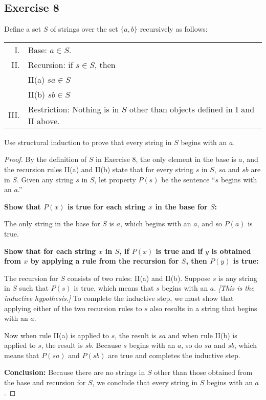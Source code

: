 \documentclass[14pt]{extarticle}
\begin{document}
\subsection{Exercise 8}
Define a set $S$ of strings over the set \(\{a, b\}\) recursively as follows:

\begin{tabular}{rl}
    I.   & Base: $a \in S$.                                                             \\
    II.  & Recursion: if $s \in S$, then                                                \\
         & II(a) $sa \in S$                                                             \\
         & II(b) $sb \in S$                                                             \\
    III. & Restriction: Nothing is in $S$ other than objects defined in I and II above.
\end{tabular}

Use structural induction to prove that every string in $S$ begins with an $a$.

\begin{proof}
    By the definition of $S$ in Exercise 8, the only element in the base is $a$, and the recursion rules II(a) and II(b)
    state that for every string $s$ in $S$, $sa$ and $sb$ are in $S$. Given any string $s$ in $S$, let property $P(s)$ be
    the sentence “$s$ begins with an $a$.”

    {\bf Show that $P(x)$ is true for each string $x$ in the base for $S$:}

    The only string in the base for $S$ is $a$, which begins with an $a$, and so $P(a)$ is true.

        {\bf Show that for each string $x$ in $S$, if $P(x)$ is true and if $y$ is obtained from $x$ by applying a rule
            from the recursion for $S$, then $P(y)$ is true:}

    The recursion for $S$ consists of two rules: II(a) and II(b). Suppose $s$ is any string in $S$ such that $P(s)$ is
    true, which means that $s$ begins with an $a$. {\it [This is the inductive hypothesis.]} To complete the inductive
    step, we must show that applying either of the two recursion rules to $s$ also results in a string that begins with an $a$.

    Now when rule II(a) is applied to $s$, the result is $sa$ and when rule II(b) is applied to $s$, the result is $sb$.
    Because $s$ begins with an $a$, so do $sa$ and $sb$, which means that $P(sa)$ and $P(sb)$ are true and completes the
    inductive step.

        {\bf Conclusion:} Because there are no strings in $S$ other than those obtained from the base and recursion for
    $S$, we conclude that every string in $S$ begins with an $a$.
\end{proof}
\end{document}
